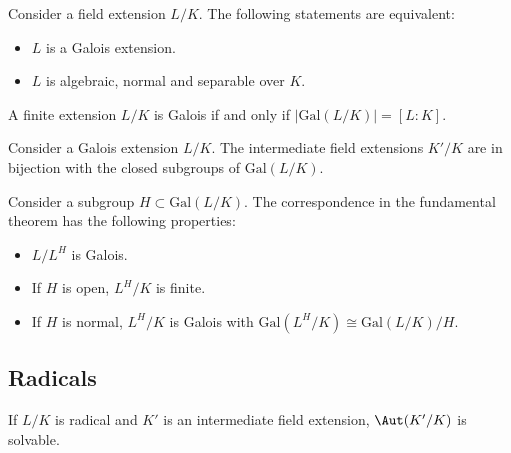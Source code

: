     \begin{property}
        Consider a field extension $L/K$. The following statements are equivalent:
        \begin{itemize}
            \item $L$ is a Galois extension.
            \item $L$ is algebraic, normal and separable over $K$.
        \end{itemize}
    \end{property}
    \begin{property}
        A finite extension $L/K$ is Galois if and only if $|\mathrm{Gal}(L/K)|=[L:K]$.
    \end{property}

    \begin{theorem}
        Consider a Galois extension $L/K$. The intermediate field extensions $K'/K$ are in bijection with the closed subgroups of $\mathrm{Gal}(L/K)$.
    \end{theorem}
    \begin{property}
        Consider a subgroup $H\subset\mathrm{Gal}(L/K)$. The correspondence in the fundamental theorem has the following properties:
        \begin{itemize}
            \item $L/L^H$ is Galois.
            \item If $H$ is open, $L^H/K$ is finite.
            \item If $H$ is normal, $L^H/K$ is Galois with $\mathrm{Gal}\left(L^H/K\right)\cong\mathrm{Gal}(L/K)/H$.
        \end{itemize}
    \end{property}

\subsection{Radicals}


    \begin{property}
        If $L/K$ is radical and $K'$ is an intermediate field extension, $\Aut(K'/K)$ is solvable.
    \end{property}

